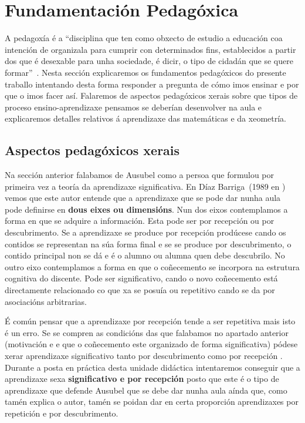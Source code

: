 
\section{Fundamentación Pedagóxica}\label{sec:pedago}

A pedagoxía é a ``disciplina que ten como obxecto de estudio a educación coa intención de organizala para cumprir con determinados fins, establecidos a partir dos que é desexable para unha sociedade, é dicir, o tipo de cidadán que se quere formar''~\cite{wiki:pedagogia}. Nesta sección explicaremos os fundamentos pedagóxicos do presente traballo intentando desta forma responder a pregunta de cómo imos ensinar e por que o imos facer así. Falaremos de aspectos pedagóxicos xerais sobre que tipos de proceso ensino-aprendizaxe pensamos se deberían desenvolver na aula e explicaremos detalles relativos á aprendizaxe das matemáticas e da xeometría.

\subsection{Aspectos pedagóxicos xerais}
Na sección anterior falabamos de Ausubel como a persoa que formulou por primeira vez a teoría da aprendizaxe significativa. En Díaz Barriga~(1989 en ) vemos que este autor entende que a aprendizaxe que se pode dar nunha aula pode definirse en \textbf{dous eixes ou dimensións}. Nun dos eixos contemplamos a forma en que se adquire a información. Esta pode ser por recepción ou por descubrimento. Se a aprendizaxe se produce por recepción prodúcese cando os contidos se representan na súa forma final e se se produce por descubrimento, o contido principal non se dá e é o alumno ou alumna quen debe descubrilo. No outro eixo contemplamos a forma en que o coñecemento se incorpora na estrutura cognitiva do discente. Pode ser significativo, cando o novo coñecemento está directamente relacionado co que xa se posuía ou repetitivo cando se da por asociacións arbitrarias.

É común pensar que a aprendizaxe por recepción tende a ser repetitiva mais isto é un erro. Se se compren as condicións das que falabamos no apartado anterior (motivación e e que o coñecemento este organizado de forma significativa) pódese xerar aprendizaxe significativo tanto por descubrimento como por recepción \cite{unedpsicoedu}. Durante a posta en práctica desta unidade didáctica intentaremos conseguir que a aprendizaxe sexa \textbf{significativo e por recepción} posto que este é o tipo de aprendizaxe que defende Ausubel que se debe dar nunha aula aínda que, como tamén explica o autor, tamén se poidan dar en certa proporción aprendizaxes por repetición e por descubrimento.

